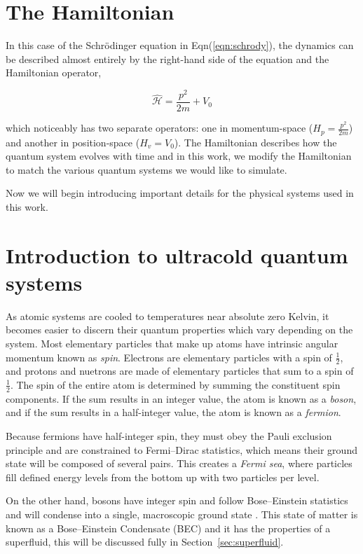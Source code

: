 \section{The Hamiltonian}

In this case of the Schr\"odinger equation in Eqn(\ref{eqn:schrody}), the dynamics can be described almost entirely by the right-hand side of the equation and the Hamiltonian operator,

\begin{equation}
\mathcal{\hat H} = \frac{p^2}{2m} + V_0
\end{equation}

which noticeably has two separate operators: one in momentum-space ($H_p = \frac{p^2}{2m}$) and another in position-space ($H_v = V_0$).
The Hamiltonian describes how the quantum system evolves with time and in this work, we modify the Hamiltonian to match the various quantum systems we would like to simulate.

Now we will begin introducing important details for the physical systems used in this work.

\section{Introduction to ultracold quantum systems}

As atomic systems are cooled to temperatures near absolute zero Kelvin, it becomes easier to discern their quantum properties which vary depending on the system.
Most elementary particles that make up atoms have intrinsic angular momentum known as \textit{spin}.
Electrons are elementary particles with a spin of $\frac{1}{2}$, and protons and nuetrons are made of elementary particles that sum to a spin of $\frac{1}{2}$.
The spin of the entire atom is determined by summing the constituent spin components.
If the sum results in an integer value, the atom is known as a \textit{boson}, and if the sum results in a half-integer value, the atom is known as a \textit{fermion}.

Because fermions have half-integer spin, they must obey the Pauli exclusion principle and are constrained to Fermi--Dirac statistics, which means their ground state will be composed of several pairs.
This creates a \textit{Fermi sea}, where particles fill defined energy levels from the bottom up with two particles per level.

On the other hand, bosons have integer spin and follow Bose--Einstein statistics and will condense into a single, macroscopic ground state \cite{Einstein1925, Fetter2003}.
This state of matter is known as a Bose--Einstein Condensate (BEC) and it has the properties of a superfluid, this will be discussed fully in Section~\ref{sec:superfluid}.

